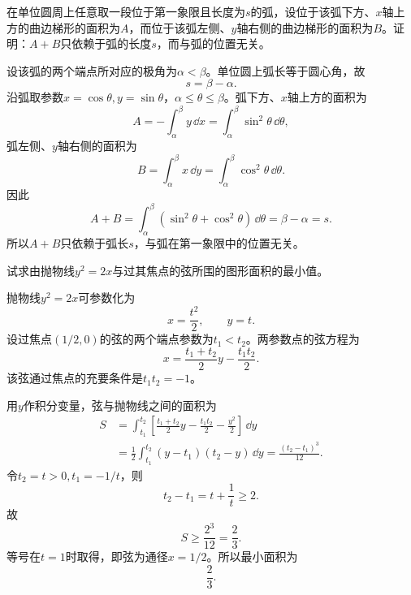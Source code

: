 \begin{xexercise}[6]
在单位圆周上任意取一段位于第一象限且长度为$s$的弧，设位于该弧下方、$x$轴上方的曲边梯形的面积为$A$，而位于该弧左侧、$y$轴右侧的曲边梯形的面积为$B$。证明：$A+B$只依赖于弧的长度$s$，而与弧的位置无关。
\end{xexercise}
\begin{xsolution}
设该弧的两个端点所对应的极角为$\alpha<\beta$。单位圆上弧长等于圆心角，故
\[
 s=\beta-\alpha.
\]
沿弧取参数$x=\cos\theta,y=\sin\theta$，$\alpha\le\theta\le\beta$。弧下方、$x$轴上方的面积为
\[
 A=-\int_{\alpha}^{\beta}y\,\dd x
 =\int_\alpha^\beta\sin^2\theta\,\dd\theta,
\]
弧左侧、$y$轴右侧的面积为
\[
 B=\int_{\alpha}^{\beta}x\,\dd y
 =\int_\alpha^\beta\cos^2\theta\,\dd\theta.
\]
因此
\[
 A+B=\int_\alpha^\beta(\sin^2\theta+\cos^2\theta)\,\dd\theta
 =\beta-\alpha=s.
\]
所以$A+B$只依赖于弧长$s$，与弧在第一象限中的位置无关。
\end{xsolution}


\begin{xexercise}[7]
试求由抛物线$y^2=2x$与过其焦点的弦所围的图形面积的最小值。
\end{xexercise}
\begin{xsolution}
抛物线$y^2=2x$可参数化为
\[
 x=\frac{t^2}{2},\qquad y=t.
\]
设过焦点$(1/2,0)$的弦的两个端点参数为$t_1<t_2$。两参数点的弦方程为
\[
 x=\frac{t_1+t_2}{2}y-\frac{t_1t_2}{2}.
\]
该弦通过焦点的充要条件是$t_1t_2=-1$。

用$y$作积分变量，弦与抛物线之间的面积为
\begin{align*}
S&=\int_{t_1}^{t_2}\left[
\frac{t_1+t_2}{2}y-\frac{t_1t_2}{2}-\frac{y^2}{2}
\right]\,\dd y\\
&=\frac12\int_{t_1}^{t_2}(y-t_1)(t_2-y)\,\dd y
=\frac{(t_2-t_1)^3}{12}.
\end{align*}
令$t_2=t>0,t_1=-1/t$，则
\[
 t_2-t_1=t+\frac1t\ge2.
\]
故
\[
 S\ge\frac{2^3}{12}=\frac23.
\]
等号在$t=1$时取得，即弦为通径$x=1/2$。所以最小面积为
\[
 \boxed{\frac23}.
\]
\end{xsolution}


